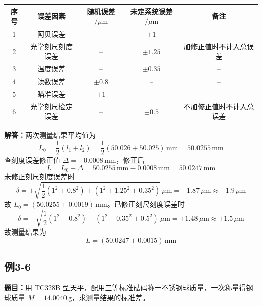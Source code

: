 \documentclass[UTF8,zihao=-4]{ctexart}
\newcommand{\problem}[1]{\subsection*{#1}}
\newcommand{\timu}{\noindent\textbf{题目：}}
\newcommand{\jieda}{\noindent\textbf{解答：}}
\begin{document}
\begin{center}
\small
\setlength{\tabcolsep}{6pt}
\begin{tabular}{c|c|c|c|c}
\toprule
序号 & 误差因素 & 随机误差$/\mu\mathrm{m}$ & 未定系统误差$/\mu\mathrm{m}$ & 备注\\
\midrule
1 & 阿贝误差 & -- & $\pm1$ & --\\
2 & 光学刻尺刻度误差 & -- & $\pm1.25$ & 加修正值时不计入总误差\\
3 & 温度误差 & -- & $\pm0.35$ & --\\
4 & 读数误差 & $\pm0.8$ & -- & --\\
5 & 瞄准误差 & $\pm1$ & -- & --\\
6 & 光学刻尺检定误差 & -- & $\pm0.5$ & 不加修正值时不计入总误差\\
\bottomrule
\end{tabular}
\end{center}

\jieda 两次测量结果平均值为
\begin{equation*}
    L_0=\frac{1}{2}(l_1+l_2)=\frac{1}{2}(50.026+50.025)\,\mathrm{mm}=50.0255\,\mathrm{mm}
\end{equation*}
查刻度误差修正值 $\Delta=-0.0008\,\mathrm{mm}$，修正后
\begin{equation*}
    L=L_0+\Delta=50.0255\,\mathrm{mm}-0.0008\,\mathrm{mm}=50.0247\,\mathrm{mm}
\end{equation*}
未修正刻尺刻度误差时
\begin{equation*}
    \delta=\pm\sqrt{\frac{1}{2}(1^2+0.8^2)+(1^2+1.25^2+0.35^2)}\,\mu\mathrm{m}
    =\pm1.87\,\mu\mathrm{m}\approx\pm1.9\,\mu\mathrm{m}
\end{equation*}
故 $L_0=(50.0255\pm0.0019)\,\mathrm{mm}$。已修正刻尺刻度误差时
\begin{equation*}
    \delta=\pm\sqrt{\frac{1}{2}(1^2+0.8^2)+(1^2+0.35^2+0.5^2)}\,\mu\mathrm{m}
    =\pm1.48\,\mu\mathrm{m}\approx\pm1.5\,\mu\mathrm{m}
\end{equation*}
故测量结果为
\begin{equation*}
    L=(50.0247\pm0.0015)\,\mathrm{mm}
\end{equation*}

\problem{例3-6}
\timu 用 TC328B 型天平，配用三等标准砝码称一不锈钢球质量，一次称量得钢球质量 $M=14.0040\,\mathrm{g}$，求测量结果的标准差。
\end{document}
